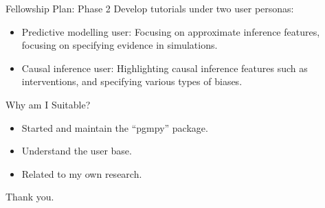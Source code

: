 \documentclass{beamer}
\begin{document}
\begin{frame}{Fellowship Plan: Phase 2}
	Develop tutorials under two user personas:

	\begin{itemize}
		\item Predictive modelling user: Focusing on approximate inference features, focusing on specifying evidence in simulations.
		\item Causal inference user: Highlighting causal inference features such as interventions, and specifying various types of biases.
	\end{itemize}
\end{frame}

\begin{frame}{Why am I Suitable?}
	\begin{itemize}
		\item Started and maintain the ``pgmpy'' package.
		\item Understand the user base. 
		\item Related to my own research.
	\end{itemize}
\end{frame}

\begin{frame}
	\huge{Thank you.}
\end{frame}
\end{document}
